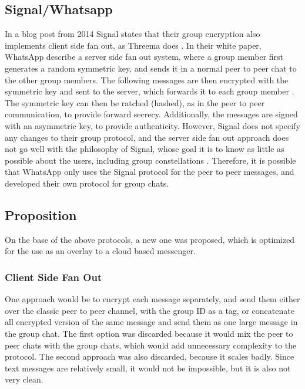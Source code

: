 \documentclass[a4paper, oneside]{discothesis}
\begin{document}
\subsection{Signal/Whatsapp}

In a blog post from 2014 Signal states that their group encryption also implements client side fan out, as Threema does \cite{SignalGroupsOld}. In their white paper, WhatsApp describe a server side fan out system, where a group member first generates a random symmetric key, and sends it in a normal peer to peer chat to the other group members. The following messages are then encrypted with the symmetric key and sent to the server, which forwards it to each group member \cite{Whatsapp}. The symmetric key can then be ratched (hashed), as in the peer to peer communication, to provide forward secrecy. Additionally, the messages are signed with an asymmetric key, to provide authenticity. However, Signal does not specify any changes to their group protocol, and the server side fan out approach does not go well with the philosophy of Signal, whose goal it is to know as little as possible about the users, including group constellations \cite{SignalGroupsNew}. Therefore, it is possible that WhatsApp only uses the Signal protocol for the peer to peer messages, and developed their own protocol for group chats.

\subsection{Proposition}
On the base of the above protocols, a new one was proposed, which is optimized for the use as an overlay to a cloud based messenger.

\subsubsection{Client Side Fan Out}
\label{sec:server_side_fan_out}

One approach would be to encrypt each message separately, and send them either over the classic peer to peer channel, with the group ID as a tag, or concatenate all encrypted version of the same message and send them as one large message in the group chat. The first option was discarded because it would mix the peer to peer chats with the group chats, which would add unnecessary complexity to the protocol. The second approach was also discarded, because it scales badly. Since text messages are relatively small, it would not be impossible, but it is also not very clean.
\end{document}
